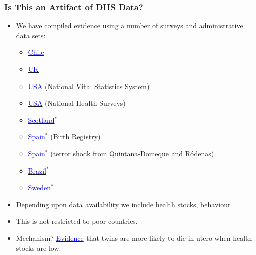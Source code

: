 \documentclass[10pt,letterpaper,subeqn]{beamer}
\begin{document}
\begin{frame}[label=c]
\frametitle{Is This an Artifact of DHS Data?}
\begin{itemize}
\item We have compiled evidence using a number of surveys and administrative data sets:
  \begin{itemize}
  \item \hyperlink{Chile}{\textcolor{blue}{Chile}}
  \item \hyperlink{UK}{\textcolor{blue}{UK}}
  \item \hyperlink{USA1}{\textcolor{blue}{USA}} (National Vital Statistics System)
  \item \hyperlink{USA2}{\textcolor{blue}{USA}} (National Health Surveys)
  \item \hyperlink{Scotland}{\textcolor{blue}{Scotland}}$^*$
  \item \hyperlink{Spain1}{\textcolor{blue}{Spain}}$^*$ (Birth Registry)
  \item \hyperlink{Spain2}{\textcolor{blue}{Spain}}$^*$ (terror shock from Quintana-Domeque and R\'odenas)
  \item \hyperlink{Brazil}{\textcolor{blue}{Brazil}}$^*$
  \item \hyperlink{Sweden}{\textcolor{blue}{Sweden}}$^*$
 \end{itemize}
\item Depending upon data availability we include health stocks, behaviour
\item This is not restricted to poor countries.
\item Mechanism?  \hyperlink{TwinDeath}{\textcolor{blue}{Evidence}} that twins are more likely to die in utero when health stocks are low.
\end{itemize}
\end{frame}

\begin{frame}[label=USA1]

\end{frame}

\begin{frame}[label=Chile]

\end{frame}

\begin{frame}[label=Spain2]

\end{frame}

\begin{frame}[label=Sweden]

\end{frame}
\end{document}
